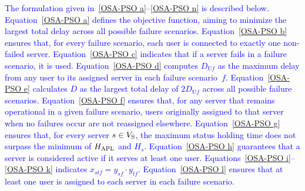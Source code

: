 \documentclass[10pt, letterpaper]{IEEEtran}
\newcommand\blue[1]{\textcolor{blue}{#1}}
\begin{document}
\begin{CJK}{UTF8}{ipxm}

\blue{
The formulation given in~\eqref{OSA-PSO a}--\eqref{OSA-PSO n} is described below.
Equation~\eqref{OSA-PSO a} defines the objective function, aiming to minimize the largest total delay across all possible failure scenarios.
Equation~\eqref{OSA-PSO b} ensures that, for every failure scenario, each user is connected to exactly one non-failed server.
Equation~\eqref{OSA-PSO c} indicates that if a server fails in a failure scenario, it is used.
%
Equation~\eqref{OSA-PSO d} computes $D_{\mathrm{U}f}$ as the maximum delay from any user to its assigned server in each failure scenario~$f$.
Equation~\eqref{OSA-PSO e} calculates $D$ as the largest total delay of $2D_{\mathrm{U}f}$ across all possible failure scenarios.
Equation~\eqref{OSA-PSO f} ensures that, for any server that remains operational in a given failure scenario, users originally assigned to that server when no failures occur are not reassigned elsewhere.
Equation~\eqref{OSA-PSO g} ensures that, for every server $s \in V_{\rm{S}}$, the maximum status holding time does not surpass the minimum of $H_{\rm APL}$ and $H_s$.
Equation~\eqref{OSA-PSO h} guarantees that a server is considered active if it serves at least one user.
Equations~\eqref{OSA-PSO i}--\eqref{OSA-PSO k} indicates $x_{stf} = y_{sf} \cdot y_{tf}$.
Equation~\eqref{OSA-PSO l} ensures that at least one user is assigned to each server in each failure scenario.
}


\end{CJK}
\end{document}
